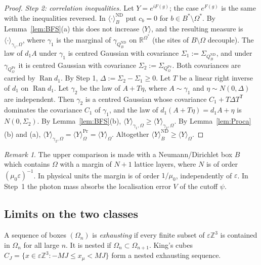 \documentclass[11pt]{amsart}
\theoremstyle{plain}
\theoremstyle{definition}
\theoremstyle{remark}
\newtheorem{remark}[theorem]{Remark}
\numberwithin{equation}{section}
\newcommand{\R}{\mathbb{R}}
\newcommand{\Z}{\mathbb{Z}}
\newcommand{\eps}{\varepsilon}
\newcommand{\ev}[1]{\langle #1\rangle}
\newcommand{\Ran}{\operatorname{Ran}}
\begin{document}
\begin{proof}
\emph{Step 2: correlation inequalities.} Let $Y=e^{iF(g)}$; the case $e^{F(g)}$ is the same with the inequalities reversed. In $\ev\cdot^{\mathrm{ND}}_B$ put $c_b=0$ for $b\in B^*\setminus\Omega^*$. By Lemma~\ref{lem:BFS}(a) this does not increase $\ev Y$, and the resulting measure is $\ev\cdot_{\gamma_1,\Omega}$, where $\gamma_1$ is the marginal of $\gamma_{Q^{\mathrm{ND}}_B}$ on $\R^{\Omega^*}$ (the sites of $B\setminus\Omega$ decouple). The law of $d_1A$ under $\gamma_1$ is centred Gaussian with covariance $\Sigma_1:=\Sigma_{Q^{\mathrm{ND}}_B}$, and under $\gamma_{Q^{\mathrm{Pr}}_\Omega}$ it is centred Gaussian with covariance $\Sigma_2:=\Sigma_{Q^{\mathrm{Pr}}_\Omega}$. Both covariances are carried by $\Ran d_1$. By Step 1, $\Delta:=\Sigma_2-\Sigma_1\ge0$. Let $T$ be a linear right inverse of $d_1$ on $\Ran d_1$. Let $\gamma_2$ be the law of $A+T\eta$, where $A\sim\gamma_1$ and $\eta\sim N(0,\Delta)$ are independent. Then $\gamma_2$ is a centred Gaussian whose covariance $C_1+T\Delta T^{\mathsf T}$ dominates the covariance $C_1$ of $\gamma_1$, and the law of $d_1(A+T\eta)=d_1A+\eta$ is $N(0,\Sigma_2)$. By Lemma~\ref{lem:BFS}(b), $\ev Y_{\gamma_1,\Omega}\ge\ev Y_{\gamma_2,\Omega}$. By Lemma~\ref{lem:Proca}(b) and (a), $\ev Y_{\gamma_2,\Omega}=\ev Y^{\mathrm{Pr}}_\Omega=\ev Y_\Omega$. Altogether $\ev Y^{\mathrm{ND}}_B\ge\ev Y_\Omega$.
\end{proof}

\begin{remark}\label{rem:margin}
The upper comparison is made with a Neumann/Dirichlet box $B$ which contains $\Omega$ with a margin of $N+1$ lattice layers, where $N$ is of order $(\mu_0\eps)^{-1}$. In physical units the margin is of order $1/\mu_0$, independently of $\eps$. In Step~1 the photon mass absorbs the localisation error $V$ of the cutoff $\psi$.
\end{remark}

\subsection{Limits on the two classes}
A sequence of boxes $(\Omega_n)$ is \emph{exhausting} if every finite subset of $\eps\Z^3$ is contained in $\Omega_n$ for all large $n$. It is nested if $\Omega_n\subset\Omega_{n+1}$. King's cubes $C_J=\{x\in\eps\Z^3:-MJ\le x_\mu<MJ\}$ \cite[(2.7)]{K2} form a nested exhausting sequence.
\end{document}
